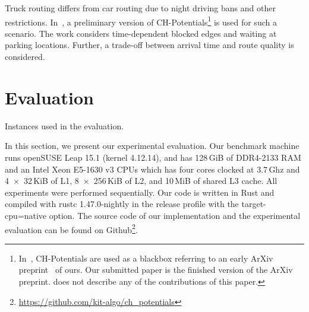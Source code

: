 \documentclass[manuscript,review]{acmart}
\begin{document}
Truck routing differs from car routing due to night driving bans and other restrictions.
In~\cite{kswz-erptd-p-20}, a preliminary version of CH-Potentials\footnote{
In~\cite{kswz-erptd-p-20}, CH-Potentials are used as a blackbox referring to an early ArXiv preprint~\cite{strasser2019perfect} of ours.
Our submitted paper is the finished version of the ArXiv preprint.
\cite{kswz-erptd-p-20} does not describe any of the contributions of this paper.
} is used for such a scenario.
The work considers time-dependent blocked edges and waiting at parking locations.
Further, a trade-off between arrival time and route quality is considered.

\section{Evaluation}

\label{sec:experiments}

\begin{table}
\centering
\caption{Instances used in the evaluation.}\label{tab:graphs}

\end{table}

In this section, we present our experimental evaluation.
Our benchmark machine runs openSUSE Leap 15.1 (kernel 4.12.14), and has 128\,GiB of DDR4-2133 RAM and an Intel Xeon E5-1630 v3 CPUs which has four cores clocked at 3.7\,Ghz and 4~$\times$~32\,KiB of L1, 8~$\times$~256\,KiB of L2, and 10\,MiB of shared L3 cache.
All experiments were performed sequentially.
Our code is written in Rust and compiled with rustc 1.47.0-nightly in the release profile with the target-cpu=native option.
The source code of our implementation and the experimental evaluation can be found on Github\footnote{\url{https://github.com/kit-algo/ch_potentials}}.
\end{document}
